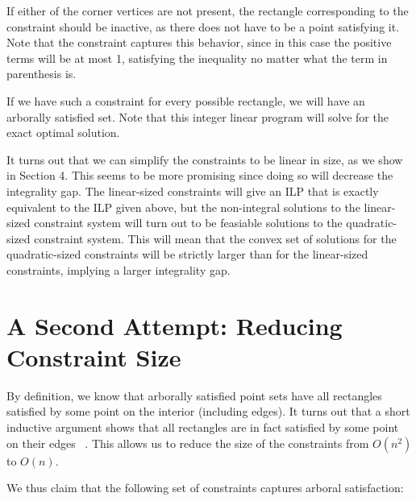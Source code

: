 \documentclass[11pt]{article}
\begin{document}

If either of the corner vertices are not present, the rectangle corresponding to the constraint should be inactive, as there does not have to be a point satisfying it. Note that the constraint captures this behavior, since in this case the positive terms will be at most 1, satisfying the inequality no matter what the term in parenthesis is.

If we have such a constraint for every possible rectangle, we will have an arborally satisfied set. Note that this integer linear program will solve for the exact optimal solution.

It turns out that we can simplify the constraints to be linear in size, as we show in Section 4. This seems to be more promising since doing so will decrease the integrality gap. The linear-sized constraints will give an ILP that is exactly equivalent to the ILP given above, but the non-integral solutions to the linear-sized constraint system will turn out to be feasiable solutions to the quadratic-sized constraint system. This will mean that the convex set of solutions for the quadratic-sized constraints will be strictly larger than for the linear-sized constraints, implying a larger integrality gap. 

\section{A Second Attempt: Reducing Constraint Size}
\label{A Second Attempt: Reducing Constraint Size}

By definition, we know that arborally satisfied point sets have all rectangles satisfied by some point on the interior (including edges). It turns out that a short inductive argument shows that all rectangles are in fact satisfied by some point on their edges ~\cite{geometryBST}. This allows us to reduce the size of the constraints from $O(n^2)$ to $O(n)$.

We thus claim that the following set of constraints captures arboral satisfaction: 
\end{document}
